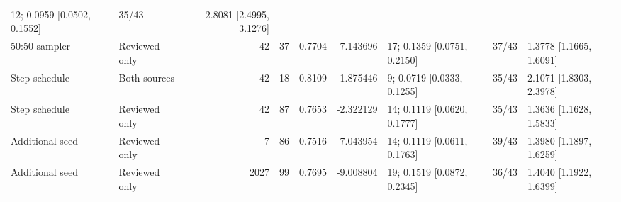 \begin{table}
\begin{center}
\begin{tabular}{L{0.09\textwidth}L{0.07\textwidth}r r r r
                L{0.205\textwidth}r L{0.20\textwidth}}
12; 0.0959 [0.0502, 0.1552] & 35/43 & 2.8081 [2.4995, 3.1276] \\
50:50 sampler & Reviewed only & 42 & 37 & 0.7704 & -7.143696 &
17; 0.1359 [0.0751, 0.2150] & 37/43 & 1.3778 [1.1665, 1.6091] \\
\addlinespace
Step schedule & Both sources & 42 & 18 & 0.8109 & 1.875446 &
9; 0.0719 [0.0333, 0.1255] & 35/43 & 2.1071 [1.8303, 2.3978] \\
Step schedule & Reviewed only & 42 & 87 & 0.7653 & -2.322129 &
14; 0.1119 [0.0620, 0.1777] & 35/43 & 1.3636 [1.1628, 1.5833] \\
\addlinespace
Additional seed & Reviewed only & 7 & 86 & 0.7516 & -7.043954 &
14; 0.1119 [0.0611, 0.1763] & 39/43 & 1.3980 [1.1897, 1.6259] \\
Additional seed & Reviewed only & 2027 & 99 & 0.7695 & -9.008804 &
19; 0.1519 [0.0872, 0.2345] & 36/43 & 1.4040 [1.1922, 1.6399] \\
\bottomrule
\end{tabular}
\end{center}
\end{table}

